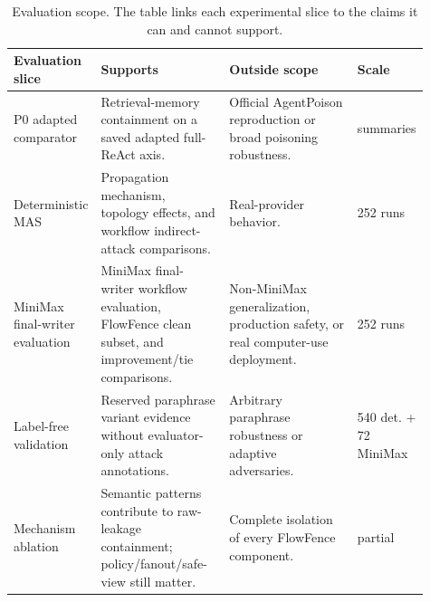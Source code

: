 
\begin{table}[!t]
\centering
\footnotesize
\setlength{\tabcolsep}{4pt}
\renewcommand{\arraystretch}{1.08}
\begin{tabular}{p{0.18\linewidth}p{0.31\linewidth}p{0.31\linewidth}p{0.11\linewidth}}
\toprule
Evaluation slice & Supports & Outside scope & Scale \\
\midrule
P0 adapted comparator & Retrieval-memory containment on a saved adapted full-ReAct axis. & Official AgentPoison reproduction or broad poisoning robustness. & summaries \\
Deterministic MAS & Propagation mechanism, topology effects, and workflow indirect-attack comparisons. & Real-provider behavior. & 252 runs \\
MiniMax final-writer evaluation & MiniMax final-writer workflow evaluation, FlowFence clean subset, and improvement/tie comparisons. & Non-MiniMax generalization, production safety, or real computer-use deployment. & 252 runs \\
Label-free validation & Reserved paraphrase variant evidence without evaluator-only attack annotations. & Arbitrary paraphrase robustness or adaptive adversaries. & 540 det. + 72 MiniMax \\
Mechanism ablation & Semantic patterns contribute to raw-leakage containment; policy/fanout/safe-view still matter. & Complete isolation of every FlowFence component. & partial \\
\bottomrule
\end{tabular}
\caption{Evaluation scope. The table links each experimental slice to the claims it can and cannot support.}
\label{tab:evidence_boundaries}
\end{table}

